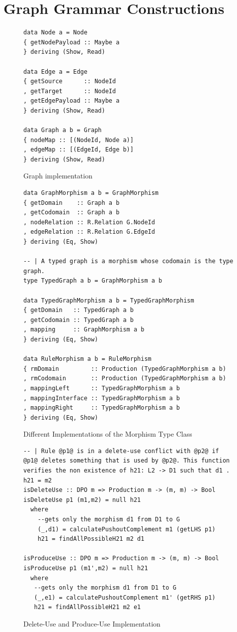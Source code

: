 \section{Graph Grammar Constructions}

\begin{figure}[!ht]

\caption{Graph implementation}
\begin{verbatim}
data Node a = Node 
{ getNodePayload :: Maybe a
} deriving (Show, Read)

data Edge a = Edge 
{ getSource      :: NodeId
, getTarget      :: NodeId
, getEdgePayload :: Maybe a
} deriving (Show, Read)

data Graph a b = Graph 
{ nodeMap :: [(NodeId, Node a)]
, edgeMap :: [(EdgeId, Edge b)]
} deriving (Show, Read)
\end{verbatim}
\end{figure}

\begin{figure}[!ht]
\caption{Different Implementations of the Morphism Type Class}
\begin{verbatim}
data GraphMorphism a b = GraphMorphism 
{ getDomain    :: Graph a b
, getCodomain  :: Graph a b
, nodeRelation :: R.Relation G.NodeId
, edgeRelation :: R.Relation G.EdgeId
} deriving (Eq, Show)

-- | A typed graph is a morphism whose codomain is the type graph.
type TypedGraph a b = GraphMorphism a b

data TypedGraphMorphism a b = TypedGraphMorphism 
{ getDomain   :: TypedGraph a b
, getCodomain :: TypedGraph a b
, mapping     :: GraphMorphism a b
} deriving (Eq, Show)

data RuleMorphism a b = RuleMorphism 
{ rmDomain         :: Production (TypedGraphMorphism a b)
, rmCodomain       :: Production (TypedGraphMorphism a b)
, mappingLeft      :: TypedGraphMorphism a b
, mappingInterface :: TypedGraphMorphism a b
, mappingRight     :: TypedGraphMorphism a b
} deriving (Eq, Show)
\end{verbatim}
\end{figure}

\begin{figure}[!ht]
\caption{Delete-Use and Produce-Use Implementation}
\begin{verbatim}
-- | Rule @p1@ is in a delete-use conflict with @p2@ if @p1@ deletes something that is used by @p2@. This function verifies the non existence of h21: L2 -> D1 such that d1 . h21 = m2
isDeleteUse :: DPO m => Production m -> (m, m) -> Bool
isDeleteUse p1 (m1,m2) = null h21
  where
    --gets only the morphism d1 from D1 to G
    (_,d1) = calculatePushoutComplement m1 (getLHS p1) 
    h21 = findAllPossibleH21 m2 d1

isProduceUse :: DPO m => Production m -> (m, m) -> Bool
isProduceUse p1 (m1',m2) = null h21
  where
   --gets only the morphism d1 from D1 to G
   (_,e1) = calculatePushoutComplement m1' (getRHS p1)
   h21 = findAllPossibleH21 m2 e1
\end{verbatim}
\end{figure}


